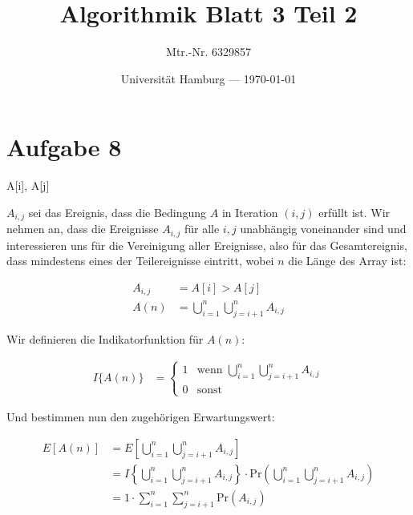 \documentclass[parskip=half,a4paper]{scrartcl}
\title{Algorithmik Blatt 3 Teil 2}
\author{Mtr.-Nr. 6329857}
\date{Universität Hamburg --- \today}
\begin{document}
\maketitle %

\section*{Aufgabe 8}


\begin{algorithmic}[1]
\Output A[i], A[j]
\EndIf
\EndFor
\EndFor
\EndProcedure
\end{algorithmic}

\linenumbers

$A_{i,j}$ sei das Ereignis, dass die Bedingung $A$ in Iteration $(i,j)$ erfüllt ist. Wir nehmen an, dass die Ereignisse $A_{i,j}$ für alle $i,j$ unabhängig voneinander sind und interessieren uns für die Vereinigung aller Ereignisse, also für das Gesamtereignis, dass mindestens eines der Teilereignisse eintritt, wobei $n$ die Länge des Array ist:

\begin{equation}
\begin{aligned}
A_{i,j} &= A[i] > A[j]\\
A(n) &= \bigcup_{i=1}^{n}{\bigcup_{j=i+1}^n}A_{i,j}
\end{aligned}
\end{equation}

Wir definieren die Indikatorfunktion für $A(n)$:

\begin{equation}
\begin{aligned}
I\{A(n)\} &= \begin{cases}
1 & \text{wenn $\bigcup_{i=1}^{n}{\bigcup_{j=i+1}^n}A_{i,j}$}\\
0 & \text{sonst}
\end{cases}
\end{aligned}
\end{equation}

Und bestimmen nun den zugehörigen Erwartungswert:

\begin{equation}
\begin{aligned}
   E\left[A(n)\right] &= E\left[\bigcup_{i=1}^n{\bigcup_{j=i+1}^n}A_{i,j}\right] \\
    &= I\left\{\bigcup_{i=1}^n{\bigcup_{j=i+1}^n}A_{i,j}\right \} \cdot \text{Pr}\left(\bigcup_{i=1}^n{\bigcup_{j=i+1}^n}A_{i,j}\right) \\
   &= 1 \cdot \sum_{i=1}^n{\sum_{j=i+1}^n}\text{Pr}\left(A_{i,j}\right)
\end{aligned}
\end{equation}
\end{document}
